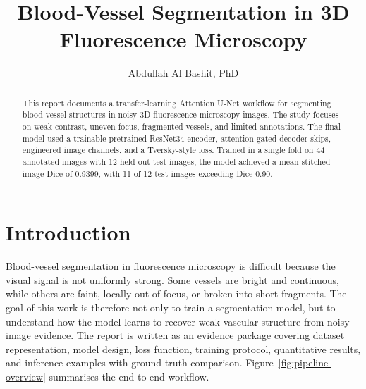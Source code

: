 \documentclass[11pt,letterpaper]{article}
\title{\bfseries Blood-Vessel Segmentation in 3D Fluorescence Microscopy}
\author{Abdullah Al Bashit, PhD}
\date{}
\begin{document}
\maketitle
\begin{abstract}
This report documents a transfer-learning Attention U-Net workflow for segmenting blood-vessel structures in noisy 3D fluorescence microscopy images. The study focuses on weak contrast, uneven focus, fragmented vessels, and limited annotations. The final model used a trainable pretrained ResNet34 encoder, attention-gated decoder skips, engineered image channels, and a Tversky-style loss. Trained in a single fold on 44 annotated images with 12 held-out test images, the model achieved a mean stitched-image Dice of 0.9399, with 11 of 12 test images exceeding Dice 0.90.
\end{abstract}
\tableofcontents
\clearpage
\section{Introduction}
Blood-vessel segmentation in fluorescence microscopy is difficult because the visual signal is not uniformly strong. Some vessels are bright and continuous, while others are faint, locally out of focus, or broken into short fragments. The goal of this work is therefore not only to train a segmentation model, but to understand how the model learns to recover weak vascular structure from noisy image evidence.
The report is written as an evidence package covering dataset representation, model design, loss function, training protocol, quantitative results, and inference examples with ground-truth comparison. Figure~\ref{fig:pipeline-overview} summarises the end-to-end workflow.
\end{document}
